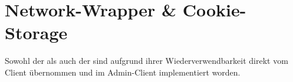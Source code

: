 \section{Network-Wrapper \& Cookie-Storage}

Sowohl der  als auch der  sind aufgrund 
ihrer Wiederverwendbarkeit direkt vom Client übernommen und im Admin-Client implementiert worden.

